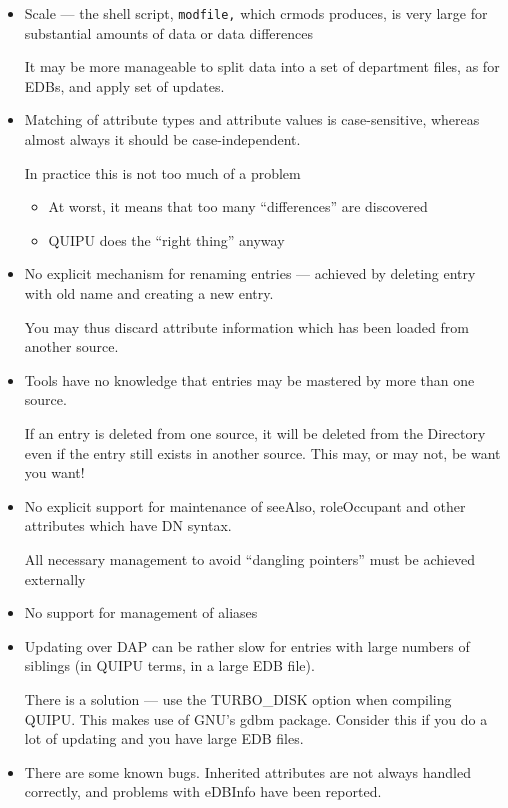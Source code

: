 \begin{itemize}
\item Scale --- the shell script, {\tt modfile,} which crmods produces, is
very large for substantial amounts of data or data differences

It may be more manageable to split data into a set of department files, as
for EDBs, and apply set of updates.

\item Matching of attribute types and attribute values is case-sensitive,
whereas almost always it should be case-independent.

In practice this is not too much of a problem

\begin{itemize}
\item At worst, it means that too many ``differences'' are discovered
\item QUIPU does the ``right thing'' anyway
\end{itemize}

\item No explicit mechanism for renaming entries --- achieved by deleting
entry with old name and creating a new entry.

You may thus discard attribute information which has been loaded from
another source.

\item Tools have no knowledge that entries may be mastered by more
than one source.

If an entry is deleted from one source, it will be deleted from the
Directory even if the entry still exists in another source.  This may, or
may not, be want you want!

\item No explicit support for maintenance of seeAlso, roleOccupant and other
attributes which have DN syntax.

All necessary management to avoid ``dangling pointers'' must be
achieved externally

\item No support for management of aliases

\item Updating over DAP can be rather slow for entries with large numbers of
siblings (in QUIPU terms, in a large EDB file).

There is a solution --- use the TURBO\_DISK option when compiling
QUIPU.  This makes use of GNU's gdbm package.  Consider this if you do
a lot of updating and you have large EDB files.

\item There are some known bugs.  Inherited attributes are not always handled 
correctly, and problems with eDBInfo have been reported.

\end{itemize}

